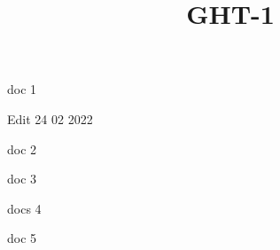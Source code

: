 \documentclass{article}
\begin{document}
\title{GHT-1}

\maketitle


doc 1


Edit 24 02 2022


doc 2


doc 3


docs 4


doc 5
\end{document}
